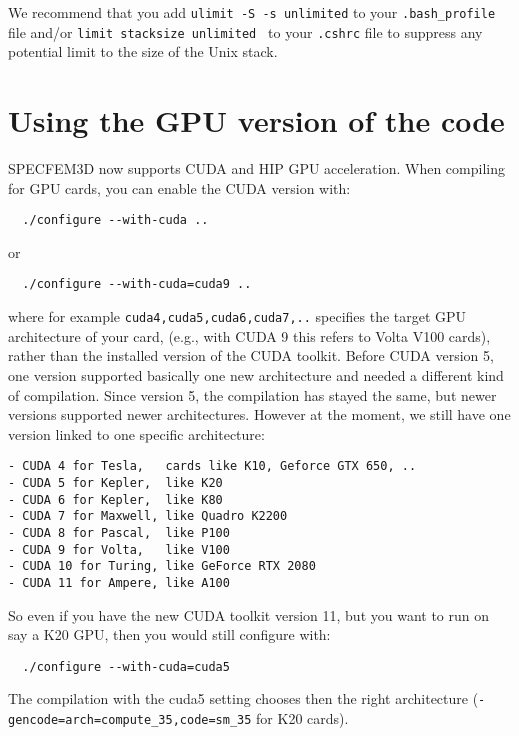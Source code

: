 We recommend that you add {\texttt{ulimit -S -s unlimited}} to your
{\texttt{.bash\_profile}} file and/or {\texttt{limit stacksize
unlimited }} to your {\texttt{.cshrc}} file to suppress any potential
limit to the size of the Unix stack.\\

\section{Using the GPU version of the code}

\noindent
SPECFEM3D now supports CUDA and HIP GPU acceleration.
When compiling for GPU cards, you can enable the CUDA version with:
\begin{verbatim}
  ./configure --with-cuda ..
\end{verbatim}
or
\begin{verbatim}
  ./configure --with-cuda=cuda9 ..
\end{verbatim}
where for example \texttt{cuda4,cuda5,cuda6,cuda7,..} specifies the target GPU architecture of your card,
(e.g., with CUDA 9 this refers to Volta V100 cards), rather than the installed version of the CUDA toolkit.
Before CUDA version 5, one version supported basically one new architecture and needed a different kind of compilation.
Since version 5, the compilation has stayed the same, but newer versions supported newer architectures.
However at the moment, we still have one version linked to one specific architecture:
\begin{verbatim}
- CUDA 4 for Tesla,   cards like K10, Geforce GTX 650, ..
- CUDA 5 for Kepler,  like K20
- CUDA 6 for Kepler,  like K80
- CUDA 7 for Maxwell, like Quadro K2200
- CUDA 8 for Pascal,  like P100
- CUDA 9 for Volta,   like V100
- CUDA 10 for Turing, like GeForce RTX 2080
- CUDA 11 for Ampere, like A100
\end{verbatim}
So even if you have the new CUDA toolkit version 11, but you want to run on say a K20 GPU, then you would still configure with:
\begin{verbatim}
  ./configure --with-cuda=cuda5
\end{verbatim}
The compilation with the cuda5 setting chooses then the right architecture (\texttt{-gencode=arch=compute\_35,code=sm\_35} for K20 cards).\\


